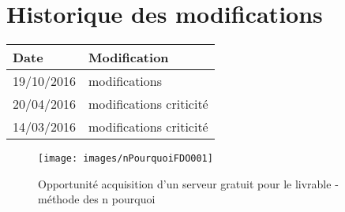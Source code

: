 \section*{Historique des modifications}
\begin{table}[h]
\centering
	\begin{tabularx}{16.8cm}{|X|X|}
	\hline
	\rowcolor{gray!40} Date & Modification \\
	\hline
	 19/10/2016 & modifications \\
	\hline
	 20/04/2016 & modifications criticité \\
	\hline
	 14/03/2016 & modifications criticité \\
	\hline
	\end{tabularx}
\end{table}
\newpage


\begin{figure}
	\centering
	\texttt{[image: images/nPourquoiFDO001]}
	\caption{\label{opportunite acquisition d'un serveur gratuit pour le livrable}Opportunité acquisition d'un serveur gratuit pour le livrable - méthode des n pourquoi}
\end{figure}
